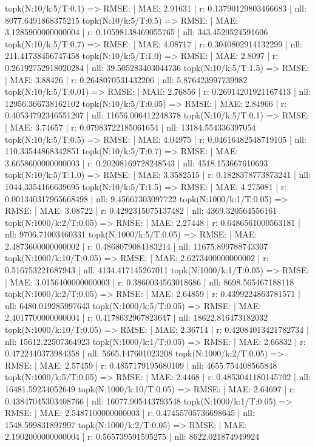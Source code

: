 topk(N:10/k:5/T:0.1) => RMSE: | MAE: 2.91631 | r: 0.13790129803466683 | nll: 8077.6491868375215
topk(N:10/k:5/T:0.5) => RMSE: | MAE: 3.1285900000000004 | r: 0.10598138469055765 | nll: 343.4529524591606
topk(N:10/k:5/T:0.7) => RMSE: | MAE: 4.08717 | r: 0.3040802914132299 | nll: 211.41738456747458
topk(N:10/k:5/T:1.0) => RMSE: | MAE: 2.8097 | r: 0.26192752918020284 | nll: 39.505283403044736
topk(N:10/k:5/T:1.5) => RMSE: | MAE: 3.88426 | r: 0.2648070531432206 | nll: 5.876423997739982
topk(N:10/k:5/T:0.01) => RMSE: | MAE: 2.76856 | r: 0.26914201921167413 | nll: 12956.366738162102
topk(N:10/k:5/T:0.05) => RMSE: | MAE: 2.84966 | r: 0.40534792346551207 | nll: 11656.006412248378
topk(N:10/k:5/T:0.1) => RMSE: | MAE: 3.74657 | r: 0.07983722185061654 | nll: 13184.554336397054
topk(N:10/k:5/T:0.5) => RMSE: | MAE: 4.04975 | r: 0.04616482548719105 | nll: 110.33544868342851
topk(N:10/k:5/T:0.7) => RMSE: | MAE: 3.6658600000000003 | r: 0.20208169728248543 | nll: 4518.153667610693
topk(N:10/k:5/T:1.0) => RMSE: | MAE: 3.3582515 | r: 0.1828378773873241 | nll: 1044.3354166639695
topk(N:10/k:5/T:1.5) => RMSE: | MAE: 4.275081 | r: 0.001340317965668498 | nll: 9.45667303097722
topk(N:1000/k:1/T:0.05) => RMSE: | MAE: 3.08722 | r: 0.4292315075137482 | nll: 4369.320564556161
topk(N:1000/k:2/T:0.05) => RMSE: | MAE: 2.27448 | r: 0.6486561000563181 | nll: 9706.71003460331
topk(N:1000/k:5/T:0.05) => RMSE: | MAE: 2.4873600000000002 | r: 0.4868079084183214 | nll: 11675.899788743307
topk(N:1000/k:10/T:0.05) => RMSE: | MAE: 2.6273400000000002 | r: 0.516753221687943 | nll: 4134.417145267011
topk(N:1000/k:1/T:0.05) => RMSE: | MAE: 3.0156400000000003 | r: 0.3860034563018686 | nll: 8698.565467188118
topk(N:1000/k:2/T:0.05) => RMSE: | MAE: 2.64859 | r: 0.4399224863781571 | nll: 6480.019285997643
topk(N:1000/k:5/T:0.05) => RMSE: | MAE: 2.4017700000000004 | r: 0.4178632967823647 | nll: 18622.816473182032
topk(N:1000/k:10/T:0.05) => RMSE: | MAE: 2.36714 | r: 0.42084013421782734 | nll: 15612.22507364923
topk(N:1000/k:1/T:0.05) => RMSE: | MAE: 2.66832 | r: 0.4722440373984358 | nll: 5665.147601023208
topk(N:1000/k:2/T:0.05) => RMSE: | MAE: 2.57459 | r: 0.4857179195680109 | nll: 4655.754408565848
topk(N:1000/k:5/T:0.05) => RMSE: | MAE: 2.4468 | r: 0.4853041180145702 | nll: 16481.59234052649
topk(N:1000/k:10/T:0.05) => RMSE: | MAE: 2.64697 | r: 0.43847045303408766 | nll: 16077.905443793548
topk(N:1000/k:1/T:0.05) => RMSE: | MAE: 2.5487100000000003 | r: 0.47455705736698645 | nll: 1548.599831897997
topk(N:1000/k:2/T:0.05) => RMSE: | MAE: 2.1902000000000004 | r: 0.565739591595275 | nll: 8622.021874949924
